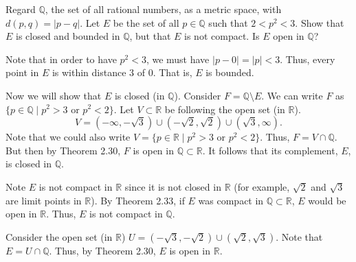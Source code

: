 \documentclass[12 pt, letterpaper]{hmcpset}
\begin{document}
\pagebreak

\begin{problem}
	Regard $\mathbb{Q}$, the set of all rational numbers, as a metric space, with $d(p, q) = \lvert p - q \rvert$. Let $E$ be the set of all $p \in \mathbb{Q}$ such that $2 < p^{2} < 3$. Show that $E$ is closed and bounded in $\mathbb{Q}$, but that $E$ is not compact. Is $E$ open in $\mathbb{Q}$?
\end{problem}

\begin{solution}
	Note that in order to have $p^{2} < 3$, we must have $\lvert p - 0 \rvert = \lvert p \rvert < 3$. Thus, every point in  $E$ is within distance $3$ of $0$. That is, $E$ is bounded.

	Now we will show that $E$ is closed (in $\mathbb{Q}$). Consider $F = \mathbb{Q} \setminus E$. We can write $F$ as $\{ p \in \mathbb{Q} \mid p^{2} > 3 \text{ or } p^{2} < 2 \}$. Let $V \subset \mathbb{R}$ be following the open set (in $\mathbb{R}$).
	\[
		V = (-\infty, -\sqrt{3}) \cup (-\sqrt{2}, \sqrt{2}) \cup (\sqrt{3}, \infty).
	\]
	Note that we could also write $V = \{ p \in \mathbb{R} \mid p^{2} > 3 \text{ or } p^{2} < 2 \}$. Thus, $F = V \cap \mathbb{Q}$. But then by Theorem 2.30, $F$ is open in $\mathbb{Q} \subset \mathbb{R}$. It follows that its complement, $E$, is closed in $\mathbb{Q}$.

	Note $E$ is not compact in $\mathbb{R}$ since it is not closed in $\mathbb{R}$ (for example, $\sqrt{2}$ and $\sqrt{3}$ are limit points in $\mathbb{R}$). By Theorem 2.33, if $E$ was compact in $\mathbb{Q} \subset \mathbb{R}$, $E$ would be open in $\mathbb{R}$. Thus, $E$ is not compact in $\mathbb{Q}$.

	Consider the open set (in $\mathbb{R}$) $U = (-\sqrt{3}, - \sqrt{2}) \cup (\sqrt 2, \sqrt{3})$. Note that $E = U \cap \mathbb{Q}$. Thus, by Theorem 2.30, $E$ is open in $\mathbb{R}$.
\end{solution}
\end{document}
